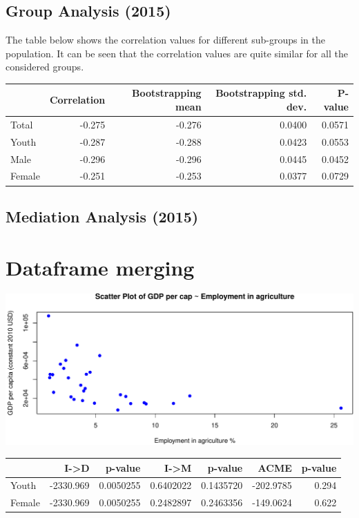\documentclass[
]{article}
\begin{document}
\hypertarget{group-analysis-2015}{%
\subsection{Group Analysis (2015)}\label{group-analysis-2015}}

The table below shows the correlation values for different sub-groups in
the population. It can be seen that the correlation values are quite
similar for all the considered groups.

\begin{table}
\centering
\begin{tabular}{l|r|r|r|r}
\hline
  & Correlation & Bootstrapping mean & Bootstrapping std. dev. & P-value\\
\hline
Total & -0.275 & -0.276 & 0.0400 & 0.0571\\
\hline
Youth & -0.287 & -0.288 & 0.0423 & 0.0553\\
\hline
Male & -0.296 & -0.296 & 0.0445 & 0.0452\\
\hline
Female & -0.251 & -0.253 & 0.0377 & 0.0729\\
\hline
\end{tabular}
\end{table}

\hypertarget{mediation-analysis-2015}{%
\subsection{Mediation Analysis (2015)}\label{mediation-analysis-2015}}

\hypertarget{dataframe-merging}{%
\section{Dataframe merging}\label{dataframe-merging}}

\includegraphics{main_files/figure-latex/mediation_agr-1.pdf}

\begin{table}
\centering
\begin{tabular}{l|r|r|r|r|r|r}
\hline
  & I->D & p-value & I->M & p-value & ACME & p-value\\
\hline
Youth & -2330.969 & 0.0050255 & 0.6402022 & 0.1435720 & -202.9785 & 0.294\\
\hline
Female & -2330.969 & 0.0050255 & 0.2482897 & 0.2463356 & -149.0624 & 0.622\\
\hline
\end{tabular}
\end{table}
\end{document}

